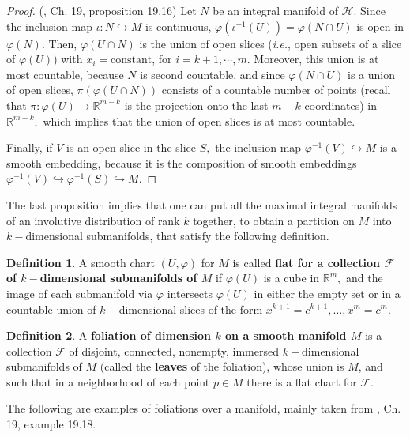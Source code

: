 \documentclass[12pt, letterpaper, reqno]{amsart}
\theoremstyle{definition}
\newtheorem{df}{Definition}
\theoremstyle{plain}
\theoremstyle{remark}
\begin{document}
\begin{proof}(\cite{lee2003introduction}, Ch. 19, proposition 19.16)
	Let $ N $ be an integral manifold of $ \mathcal{H}. $ Since the inclusion map $ \iota: N \hookrightarrow M $ is continuous, $ \varphi( \iota^{-1}(U))=\varphi(N\cap U) $  is open in $ \varphi(N) $. Then, $ \varphi(U\cap N) $ is the union of open slices (\textit{i.e.}, open subsets of a slice of $ \varphi(U)$) with $ x_i=\text{constant} $, for $ i=k+1,\cdots,m.$ Moreover, this union is at most countable, because $ N $ is second countable, and since $ \varphi(N\cap U) $ is a union of open slices, $ \pi(\varphi(U\cap N)) $ consists of a countable number of points (recall that $ \pi: \varphi(U) \rightarrow \mathbb{R}^{m-k} $ is the projection onto the last $ m-k $ coordinates) in $ \mathbb{R}^{m-k}, $ which implies that the union of open slices is at most countable.  

	Finally, if $ V $ is an open slice in the slice $ S, $ the inclusion map $ \varphi^{-1}(V) \hookrightarrow M $ is a smooth embedding, because it is the composition of smooth embeddings $ \varphi^{-1}(V)\hookrightarrow \varphi^{-1}(S) \hookrightarrow M.$ 
\end{proof}

The last proposition implies that one can put all the maximal integral manifolds of an involutive distribution of rank $ k $  together, to obtain a partition on $ M $ into $ k- $dimensional submanifolds, that satisfy the following definition.
\begin{df}
	A smooth chart $ (U,\varphi) $ for $ M $ is called \textbf{flat for a collection $ \mathcal{F} $ of $ k- $dimensional submanifolds of $ M $} if $ \varphi(U) $ is a cube in $ \mathbb{R}^m, $ and the image of each submanifold via $ \varphi $ intersects $ \varphi(U) $ in either the empty set or in a countable union of $ k- $dimensional slices of the form $ x^{k+1}=c^{k+1},\dots,x^m=c^m. $   
\end{df}

\begin{df}
	A \textbf{foliation of dimension $ k $ on a smooth manifold $ M $} is a collection $ \mathcal{F} $ of disjoint, connected, nonempty, immersed $ k- $dimensional submanifolds of $ M $ (called the \textbf{leaves} of the foliation), whose union is $ M $, and such that in a neighborhood of each point $ p\in M $ there is a flat chart for $ \mathcal{F}. $  
\end{df}

The following are examples of foliations over a manifold, mainly taken from \cite{lee2003introduction}, Ch. 19, example 19.18.
\end{document}
